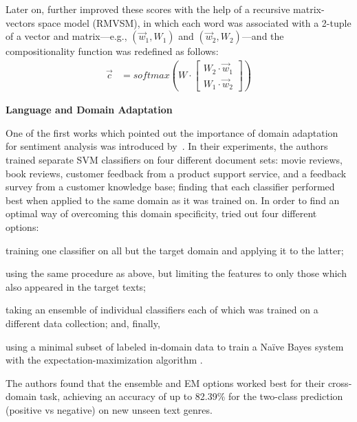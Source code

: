 Later on, \citet{Socher:12} further improved these scores with the
help of a recursive matrix-vectors space model (RMVSM), in which each
word was associated with a 2-tuple of a vector and matrix---e.g.,
$(\vec{w}_1, W_1)$ and $(\vec{w}_2, W_2)$---and the compositionality
function was redefined as follows:
\begin{align*}
  \vec{c} &= softmax\left(W\cdot\begin{bmatrix}
  W_2\cdot\vec{w}_1\\
  W_1\cdot\vec{w}_2
  \end{bmatrix}\right)
\end{align*}

\citet{Wang:15}

\textbf{Language and Domain Adaptation}

One of the first works which pointed out the importance of domain
adaptation for sentiment analysis was introduced by~\citet{Aue:05}.
In their experiments, the authors trained separate SVM classifiers on
four different document sets: movie reviews, book reviews, customer
feedback from a product support service, and a feedback survey from a
customer knowledge base; finding that each classifier performed best
when applied to the same domain as it was trained on.  In order to
find an optimal way of overcoming this domain specificity,
\citet{Aue:05} tried out four different options:
\begin{inparaenum}[(i)]
\item\label{sent-cgsa:lst:rel-wrk1} training one classifier on all but
  the target domain and applying it to the latter;
\item using the same procedure as above, but limiting the features to
  only those which also appeared in the target texts;
\item taking an ensemble of individual classifiers each of which was
  trained on a different data collection; and, finally,
\item using a minimal subset of labeled in-domain data to train a
  Na{\"i}ve Bayes system with the expectation-maximization algorithm
  \cite[EM;][]{Dempster:77}.
\end{inparaenum}
The authors found that the ensemble and EM options worked best for
their cross-domain task, achieving an accuracy of up to 82.39\% for
the two-class prediction (positive vs negative) on new unseen text
genres.

